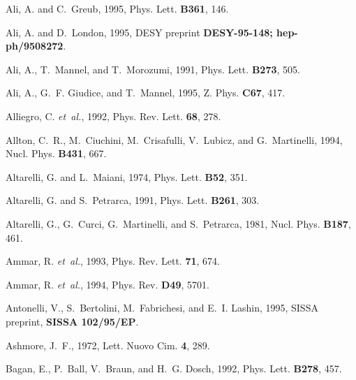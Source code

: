 \begin{thebibliography}{\protect{}1991}
Ali, A. and C.~Greub, 1995,
\newblock Phys. Lett. {\bf B361}, 146.

Ali, A. and D.~London, 1995,
\newblock DESY preprint {\bf DESY-95-148; hep-ph/9508272}.

Ali, A., T.~Mannel, and T.~Morozumi, 1991,
\newblock Phys. Lett. {\bf B273}, 505.

Ali, A., G.~F. Giudice, and T.~Mannel, 1995,
\newblock Z. Phys. {\bf C67}, 417.

Alliegro, C. {\em et~al.\/}, 1992,
\newblock Phys. Rev. Lett. {\bf 68}, 278.

Allton, C.~R., M.~Ciuchini, M.~Crisafulli, V.~Lubicz, and G.~Martinelli, 1994,
\newblock Nucl. Phys. {\bf B431}, 667.

Altarelli, G. and L.~Maiani, 1974,
\newblock Phys. Lett. {\bf B52}, 351.

Altarelli, G. and S.~Petrarca, 1991,
\newblock Phys. Lett. {\bf B261}, 303.

Altarelli, G., G.~Curci, G.~Martinelli, and S.~Petrarca, 1981,
\newblock Nucl. Phys. {\bf B187}, 461.

Ammar, R. {\em et~al.\/}, 1993,
\newblock Phys. Rev. Lett. {\bf 71}, 674.

Ammar, R. {\em et~al.\/}, 1994,
\newblock Phys. Rev. {\bf D49}, 5701.

Antonelli, V., S.~Bertolini, M.~Fabrichesi, and E.~I. Lashin, 1995,
\newblock SISSA preprint, {\bf SISSA 102/95/EP}.

Ashmore, J.~F., 1972,
\newblock Lett. Nuovo Cim. {\bf 4}, 289.

Bagan, E., P.~Ball, V.~Braun, and H.~G. Dosch, 1992,
\newblock Phys. Lett. {\bf B278}, 457.


\end{thebibliography}

